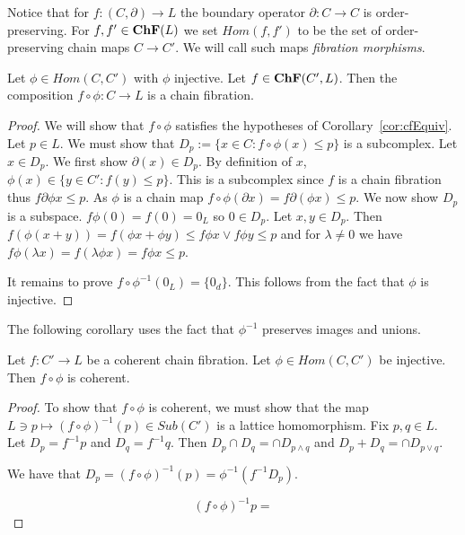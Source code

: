 Notice that for $f:(C,\partial)\to L$ the boundary operator $\partial:C\to C$ is order-preserving.  For $f,f'\in {\bf ChF}(L)$ we set $Hom(f,f')$ to be the set of order-preserving chain maps $C\to C'$.  We will call such maps {\em fibration morphisms}.

\begin{prop}\label{prop:compCF}
Let $\phi\in Hom(C,C')$ with $\phi$ injective.  Let $f\in {\bf ChF}(C',L)$.  Then the composition $f\circ\phi:C\to L$ is a chain fibration.
\end{prop}
\begin{proof}
We will show that $f\circ \phi$ satisfies the hypotheses of Corollary~\ref{cor:cfEquiv}.  Let $p\in L$.  We must show that $D_p:= \{x\in C: f\circ\phi(x)\leq p\}$ is a subcomplex.  Let $x\in D_p$.  We first show $\partial(x)\in D_p$.  By definition of $x$, $\phi(x)\in \{y\in C':f(y)\leq p\}$.  This is a subcomplex since $f$ is a chain fibration thus $f\partial \phi x \leq p$.  As $\phi$ is a chain map $f\circ \phi(\partial x) = f \partial (\phi x) \leq p$.  We now show $D_p$ is a subspace.   $f\phi ( 0 ) = f (0) = 0_L$ so $0\in D_p$.  Let $x,y\in D_p$.  Then $f(\phi(x+y))=f(\phi x + \phi y)\leq f\phi x \vee f\phi y \leq p$ and for $\lambda\neq 0$ we have $f\phi (\lambda x) = f(\lambda \phi x) = f\phi x \leq p$.    

It remains to prove $f\circ \phi^{-1}(0_L) = \{0_d\}$.  This follows from the fact that $\phi$ is injective.
\end{proof}

The following corollary uses the fact that $\phi^{-1}$ preserves images and unions.
\begin{cor}\label{prop:compCoherent}
Let $f:C'\to L$ be a coherent chain fibration.  Let $\phi\in Hom(C,C')$ be injective.  Then $f\circ \phi$ is coherent.  
\end{cor}
\begin{proof}
To show that $f\circ \phi$ is coherent, we must show that the map $L\ni p\mapsto (f\circ \phi)^{-1}(p)\in Sub(C')$ is a lattice homomorphism.  Fix $p,q\in L$.    Let $D_p = f^{-1}p$ and $D_q = f^{-1}q$.  Then $D_p \cap D_q = \cap D_{p\wedge q}$ and $D_p+D_q = \cap D_{p\vee q}$.  

We have that $D_p = (f\circ \phi)^{-1}(p) = \phi^{-1}(f^{-1}D_p)$.

$$(f\circ \phi)^{-1}p = $$












\end{proof}

